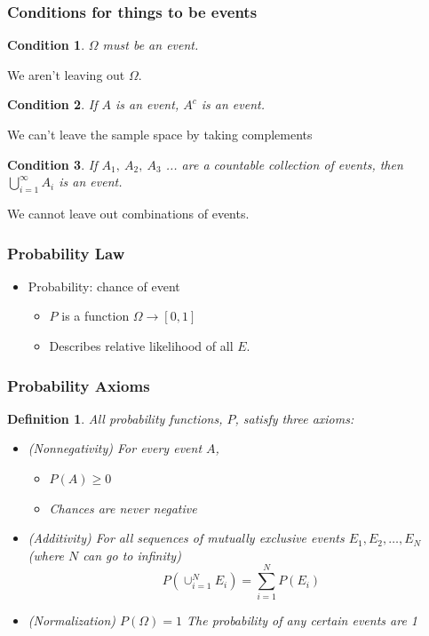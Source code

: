 \documentclass[handout]{beamer}
\newtheorem{condition}{Condition}
\newtheorem{defn}{Definition}
\numberwithin{equation}{section}
\begin{document}
\begin{frame}
\frametitle{Conditions for things to be events}


\begin{condition}
$\Omega$ must be an event. \\
\end{condition}

We aren't leaving out $\Omega$.

\begin{condition}
If $A$ is an event, $A^c$ is an event. \\
\end{condition}

We can't leave the sample space by taking complements

\begin{condition}
If $A_1,\ A_2,\ A_3$ ... are a countable collection of events, then $\bigcup_{i=1}^\infty A_i$ is an event. \\
\end{condition}

We cannot leave out combinations of events.

\end{frame}




\begin{frame}
\frametitle{Probability Law}

\begin{itemize}
\item \alert{Probability}: chance of event \pause 
\begin{itemize}
\item[-] $P$ is a function $\Omega \rightarrow [0,1]$\pause 
\item[-] Describes relative likelihood of all $E$.
\end{itemize}
\end{itemize}

\end{frame}

\begin{frame}
\frametitle{Probability Axioms} 


\begin{defn}
All probability functions, $P$, satisfy three axioms: \pause 
\begin{itemize}
\item[1)] (Nonnegativity) For every event $A$,  \pause 
\begin{itemize}
\item[] $P(A) \geq 0$  \pause 
\item[] Chances are never negative \pause 
\end{itemize}
\item[2)] (Additivity) For all sequences of mutually exclusive events $E_{1},  E_{2}, \hdots,E_{N} $ (where $N$ can go to infinity)\\ \pause 
$$P\left(\cup_{i=1}^{N} E_{i}  \right)  = \sum_{i=1}^{N} P(E_{i} ) $$
\item[3)] (Normalization) $P(\Omega) = 1$ \pause 
The probability of any certain events are 1 \pause 
\end{itemize}
\end{defn}
\end{frame}
\end{document}
